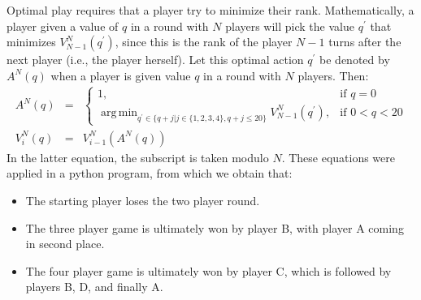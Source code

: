 \documentclass[10pt,a4paper]{article}
\DeclareMathOperator*{\argmin}{arg\,min}
\begin{document}
Optimal play requires that a player try to minimize their rank. Mathematically, a player given a value of $q$ in a round with $N$ players will pick the value $q^{\prime}$ that minimizes $V_{N-1}^{N}(q^{\prime})$, since this is the rank of the player $N-1$ turns after the next player (i.e., the player herself). Let this optimal action $q^{\prime}$ be denoted by $A^{N}(q)$ when a player is given value $q$ in a round with $N$ players. Then:
\begin{eqnarray}
A^{N}(q) & = & \left\{
\begin{array}{ll}
1,& \textrm{if } q = 0\\
\argmin_{q^{\prime} \in \{q + j | j \in \{1, 2, 3, 4\}, q + j \leq 20\}} V_{N-1}^{N}(q^{\prime}),& \textrm{if } 0 < q < 20
\end{array}\right.\\
V_{i}^{N}(q) & = & V_{i-1}^{N}(A^{N}(q))
\end{eqnarray}
In the latter equation, the subscript is taken modulo $N$. These equations were applied in a python program, from which we obtain that:
\begin{itemize}
\item{The starting player loses the two player round.}
\item{The three player game is ultimately won by player B, with player A coming in second place.}
\item{The four player game is ultimately won by player C, which is followed by players B, D, and finally A.}
\end{itemize}
\end{document}
